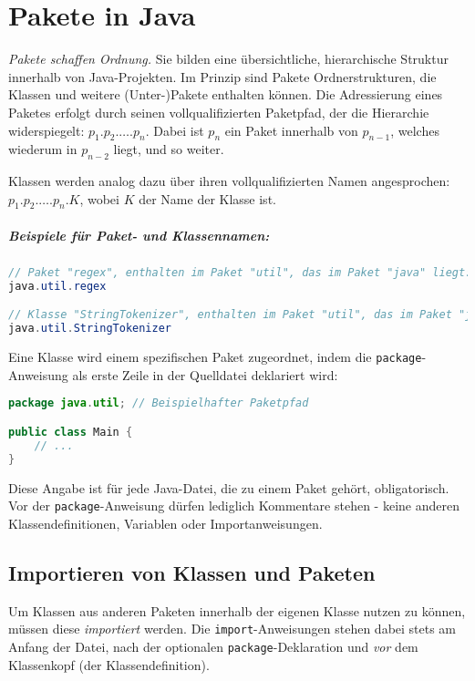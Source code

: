\chapter{Pakete in Java}
\label{chap:pakete}

\textit{Pakete schaffen Ordnung.} Sie bilden eine übersichtliche, hierarchische Struktur innerhalb von Java-Projekten.
Im Prinzip sind Pakete Ordnerstrukturen, die Klassen und weitere (Unter-)Pakete enthalten können.
Die Adressierung eines Paketes erfolgt durch seinen vollqualifizierten Paketpfad, der die Hierarchie widerspiegelt:
$p_1.p_2.\dots.p_n$. Dabei ist $p_n$ ein Paket innerhalb von $p_{n-1}$, welches wiederum in $p_{n-2}$ liegt, und so weiter.

Klassen werden analog dazu über ihren vollqualifizierten Namen angesprochen: $p_1.p_2.\dots.p_n.K$, wobei $K$ der Name der Klasse ist.

\paragraph{Beispiele für Paket- und Klassennamen:}
\begin{lstlisting}[language=Java, caption={Beispiele für Paket- und Klassenspezifikationen}, label=lst:paketbeispiele]
// Paket "regex", enthalten im Paket "util", das im Paket "java" liegt:
java.util.regex

// Klasse "StringTokenizer", enthalten im Paket "util", das im Paket "java" liegt:
java.util.StringTokenizer
\end{lstlisting}

Eine Klasse wird einem spezifischen Paket zugeordnet, indem die \texttt{package}-Anweisung als erste Zeile in der Quelldatei deklariert wird:
\begin{lstlisting}[language=Java, caption={Deklaration der Paketzugehörigkeit}]
package java.util; // Beispielhafter Paketpfad

public class Main {
    // ...
}
\end{lstlisting}
Diese Angabe ist für jede Java-Datei, die zu einem Paket gehört, obligatorisch. Vor der \texttt{package}-Anweisung dürfen lediglich Kommentare stehen
- keine anderen Klassendefinitionen, Variablen oder Importanweisungen.

\section{Importieren von Klassen und Paketen}
\label{sec:importieren}

Um Klassen aus anderen Paketen innerhalb der eigenen Klasse nutzen zu können, müssen diese \textit{importiert} werden.
Die \texttt{import}-Anweisungen stehen dabei stets am Anfang der Datei, nach der optionalen \texttt{package}-Deklaration und 
\textit{vor} dem Klassenkopf (der Klassendefinition).

